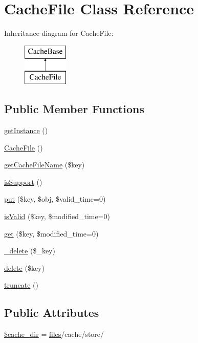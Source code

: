 \hypertarget{classCacheFile}{}\section{Cache\+File Class Reference}
\label{classCacheFile}
Inheritance diagram for Cache\+File\+:\begin{figure}[H]
\begin{center}
\leavevmode
\includegraphics[height=2.000000cm]{classCacheFile}
\end{center}
\end{figure}
\subsection*{Public Member Functions}
\begin{DoxyCompactItemize}
\item 
\hyperlink{classCacheFile_a5389ea809c31aed387c12eb37b2677b8}{get\+Instance} ()
\item 
\hyperlink{classCacheFile_a989f8b586fb83812f1c0ab1e3f2e302a}{Cache\+File} ()
\item 
\hyperlink{classCacheFile_a15ca23dea98604dc2e6d067f9ce48242}{get\+Cache\+File\+Name} (\$key)
\item 
\hyperlink{classCacheFile_ab3982221be8af4a74302b648831d1376}{is\+Support} ()
\item 
\hyperlink{classCacheFile_a1883472236dececa9215546dae2733cc}{put} (\$key, \$obj, \$valid\+\_\+time=0)
\item 
\hyperlink{classCacheFile_ab154224d403ed4199885414cfa34d713}{is\+Valid} (\$key, \$modified\+\_\+time=0)
\item 
\hyperlink{classCacheFile_aa5834aeb4fce61fe5e99d06fe3795d84}{get} (\$key, \$modified\+\_\+time=0)
\item 
\hyperlink{classCacheFile_a59058fb815de83e25ec107fec5dff2d2}{\+\_\+delete} (\$\+\_\+key)
\item 
\hyperlink{classCacheFile_aae765f3dbe6d888b5e272c247f696518}{delete} (\$key)
\item 
\hyperlink{classCacheFile_a990fc76da2501ced9077aff881350f7f}{truncate} ()
\end{DoxyCompactItemize}
\subsection*{Public Attributes}
\begin{DoxyCompactItemize}
\item 
\hyperlink{classCacheFile_a39d0574a28dd55f6b312811f411f2f51}{\$cache\+\_\+dir} = \textquotesingle{}\hyperlink{popup_8min_8js_a0742cac2750bccc2d88ac080fb9daa22}{files}/cache/store/\textquotesingle{}
\end{DoxyCompactItemize}



